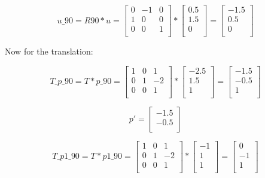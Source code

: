\documentclass{article}
\begin{document}
\[
    u\_90 = R90 * u =
    \begin{bmatrix}
        0 & -1 & 0 \\
        1 & 0  & 0 \\
        0 & 0  & 1 \\
    \end{bmatrix}
    *
    \begin{bmatrix}
        0.5 \\
        1.5 \\
        0   \\
    \end{bmatrix}
    =
    \begin{bmatrix}
        -1.5 \\
        0.5  \\
        0    \\
    \end{bmatrix}
\]

Now for the translation:



\[
    T\_p\_90 = T * p\_90 =
    \begin{bmatrix}
        1 & 0 & 1  \\
        0 & 1 & -2 \\
        0 & 0 & 1  \\
    \end{bmatrix}
    *
    \begin{bmatrix}
        -2.5 \\
        1.5  \\
        1    \\
    \end{bmatrix}
    =
    \begin{bmatrix}
        -1.5 \\
        -0.5 \\
        1    \\
    \end{bmatrix}
\]



\[
    p' =
    \begin{bmatrix}
        -1.5 \\
        -0.5 \\
    \end{bmatrix}
\]


\[
    T\_p1\_90 = T * p1\_90 =
    \begin{bmatrix}
        1 & 0 & 1  \\
        0 & 1 & -2 \\
        0 & 0 & 1  \\
    \end{bmatrix}
    *
    \begin{bmatrix}
        -1 \\
        1  \\
        1  \\
    \end{bmatrix}
    =
    \begin{bmatrix}
        0  \\
        -1 \\
        1  \\
    \end{bmatrix}
\]
\end{document}

